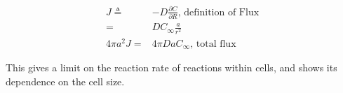 \documentclass[]{article}
\begin{document}
\begin{align*}
J \triangleq& -D \frac{\partial C}{\partial R}\text{, definition of Flux}\\
=& D C_\infty \frac{a}{r^2}\\
4 \pi a^2 J =& 4 \pi D a C_{\infty} \text{, total flux}
\end{align*}

This gives a limit on the reaction rate of reactions within cells, and shows its dependence on the cell size. 

\printglossaries

 


\end{document}

